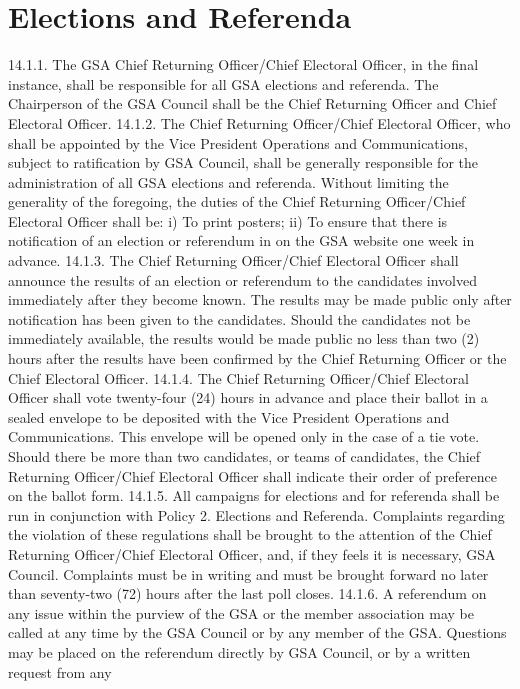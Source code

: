 \documentclass{article}
\begin{document}
\section{Elections and Referenda }
14.1.1. The GSA Chief Returning Officer/Chief Electoral Officer, in the 
final instance, shall be responsible for all GSA elections and referenda. 
The Chairperson of the GSA Council shall be the Chief Returning 
Officer and Chief Electoral Officer. 
14.1.2. The Chief Returning Officer/Chief Electoral Officer, who shall be 
appointed by the Vice President Operations and Communications, 
subject to ratification by GSA Council, shall be generally responsible 
for the administration of all GSA elections and referenda. Without 
limiting the generality of the foregoing, the duties of the Chief 
Returning Officer/Chief Electoral Officer shall be: 
i) To print posters; 
ii) To ensure that there is notification of an election or referendum in on 
the GSA website one week in advance. 
14.1.3. The Chief Returning Officer/Chief Electoral Officer shall announce 
the results of an election or referendum to the candidates involved 
immediately after they become known. The results may be made public only after notification has been given to the candidates. Should 
the candidates not be immediately available, the results would be made 
public no less than two (2) hours after the results have been confirmed 
by the Chief Returning Officer or the Chief Electoral Officer. 
14.1.4. The Chief Returning Officer/Chief Electoral Officer shall vote 
twenty-four (24) hours in advance and place their ballot in a sealed 
envelope to be deposited with the Vice President Operations and 
Communications. This envelope will be opened only in the case of a 
tie vote. Should there be more than two candidates, or teams of 
candidates, the Chief Returning Officer/Chief Electoral Officer shall 
indicate their order of preference on the ballot form. 
14.1.5. All campaigns for elections and for referenda shall be run in 
conjunction with Policy 2. Elections and Referenda. Complaints 
regarding the violation of these regulations shall be brought to the 
attention of the Chief Returning Officer/Chief Electoral Officer, and, if 
they feels it is necessary, GSA Council. Complaints must be in writing 
and must be brought forward no later than seventy-two (72) hours after 
the last poll closes. 
14.1.6. A referendum on any issue within the purview of the GSA or the 
member association may be called at any time by the GSA Council or 
by any member of the GSA. Questions may be placed on the 
referendum directly by GSA Council, or by a written request from any 
\end{document}
